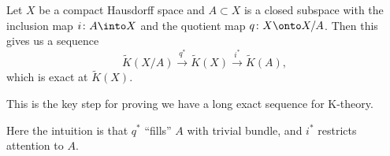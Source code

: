 \begin{proposition}
Let $X$ be a compact Hausdorff space and $A\subset X$ is a closed
subspace with the inclusion map $i\colon A\into X$ and the quotient
map $q\colon X\onto X/A$. Then this gives us a sequence
\begin{equation}
\widetilde{K}(X/A)\xrightarrow{q^{*}}\widetilde{K}(X)\xrightarrow{i^{*}}\widetilde{K}(A),
\end{equation}
which is exact at $\widetilde{K}(X)$.
\end{proposition}

\begin{remark}
This is the key step for proving we have a long exact sequence for K-theory.
\end{remark}

\begin{remark}
Here the intuition is that $q^{*}$ ``fills'' $A$ with trivial bundle,
and $i^{*}$ restricts attention to $A$.
\end{remark}